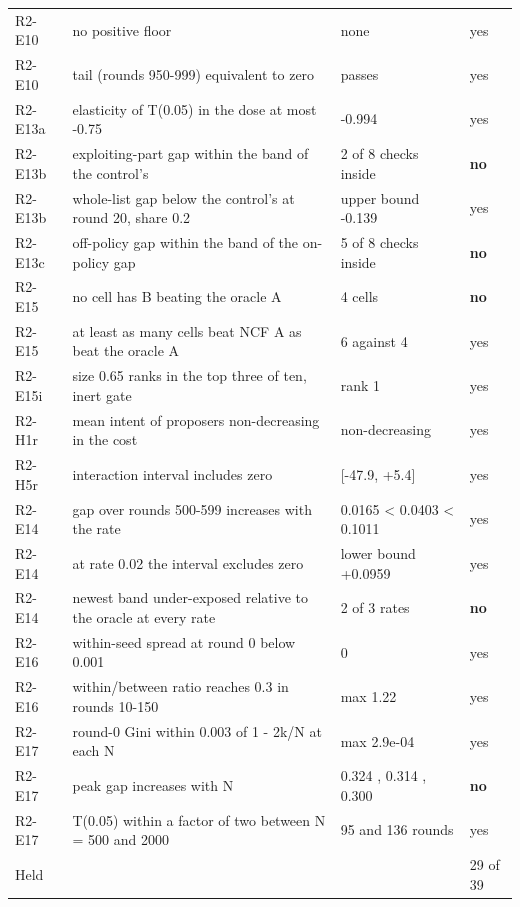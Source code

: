 \begin{tabular}{lp{6.2cm}p{4.4cm}l}
R2-E10 & no positive floor & none & yes \\
R2-E10 & tail (rounds 950-999) equivalent to zero & passes & yes \\
R2-E13a & elasticity of T(0.05) in the dose at most -0.75 & -0.994 & yes \\
R2-E13b & exploiting-part gap within the band of the control's & 2 of 8 checks inside & \textbf{no} \\
R2-E13b & whole-list gap below the control's at round 20, share 0.2 & upper bound -0.139 & yes \\
R2-E13c & off-policy gap within the band of the on-policy gap & 5 of 8 checks inside & \textbf{no} \\
R2-E15 & no cell has B beating the oracle A & 4 cells & \textbf{no} \\
R2-E15 & at least as many cells beat NCF A as beat the oracle A & 6 against 4 & yes \\
R2-E15i & size 0.65 ranks in the top three of ten, inert gate & rank 1 & yes \\
R2-H1r & mean intent of proposers non-decreasing in the cost & non-decreasing & yes \\
R2-H5r & interaction interval includes zero & [-47.9, +5.4] & yes \\
R2-E14 & gap over rounds 500-599 increases with the rate & 0.0165 < 0.0403 < 0.1011 & yes \\
R2-E14 & at rate 0.02 the interval excludes zero & lower bound +0.0959 & yes \\
R2-E14 & newest band under-exposed relative to the oracle at every rate & 2 of 3 rates & \textbf{no} \\
R2-E16 & within-seed spread at round 0 below 0.001 & 0 & yes \\
R2-E16 & within/between ratio reaches 0.3 in rounds 10-150 & max 1.22 & yes \\
R2-E17 & round-0 Gini within 0.003 of 1 - 2k/N at each N & max 2.9e-04 & yes \\
R2-E17 & peak gap increases with N & 0.324 , 0.314 , 0.300 & \textbf{no} \\
R2-E17 & T(0.05) within a factor of two between N = 500 and 2000 & 95 and 136 rounds & yes \\
\hline
\multicolumn{3}{l}{Held} & 29 of 39 \\
\hline
\end{tabular}
